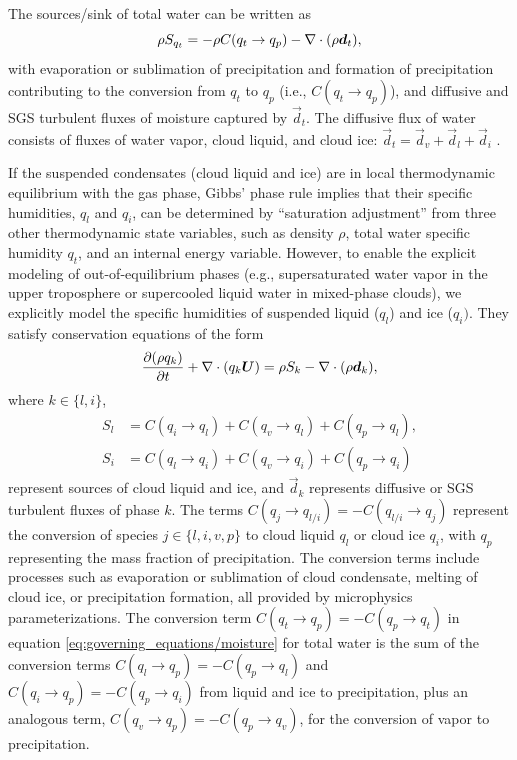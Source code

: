 \documentclass{article}
\begin{document}
The sources/sink of total water can be written as  
\begin{equation}
     \rho S_{q_t} = - \rho C(q_t \rightarrow q_p) - \nabla \cdot (\rho \boldsymbol{{d}}_t),
\end{equation}
with evaporation or sublimation of precipitation and formation of precipitation contributing to the conversion from $q_t$ to $q_p$ (i.e., $C(q_t \rightarrow q_p)$), and diffusive and SGS turbulent fluxes of moisture captured by $\vec{d}_t$. The diffusive flux of water consists of fluxes of water vapor, cloud liquid, and cloud ice: $\vec{d}_t =\vec{d}_v + \vec{d}_l + \vec{d}_i$ \citep{Romps08a}.

If the suspended condensates (cloud liquid and ice) are in local thermodynamic equilibrium with the gas phase, Gibbs' phase rule implies that their specific humidities, $q_l$ and $q_i$, can be determined by ``saturation adjustment'' from three other thermodynamic state variables, such as density $\rho$, total water specific humidity $q_t$, and an internal energy variable. However, to enable the explicit modeling of out-of-equilibrium phases (e.g., supersaturated water vapor in the upper troposphere or supercooled liquid water in mixed-phase clouds), we explicitly model the specific humidities of suspended liquid ($q_l$) and ice ($q_i)$. They satisfy conservation equations of the form
\begin{equation}
\frac{\partial (\rho q_k)}{\partial t} + \nabla \cdot (q_k \boldsymbol{{U}}) = \rho S_k  -\nabla \cdot (\rho \boldsymbol{{d}}_{k}),   
\label{eq:governing_equations/condensate}
\end{equation}
where $k \in \{l, i\}$, 
\begin{align}
    S_l & = C(q_i \rightarrow q_l) + C(q_v \rightarrow q_l) + C(q_p \rightarrow q_l), \\
    S_i & = C(q_l \rightarrow q_i) + C(q_v \rightarrow q_i) + C(q_p \rightarrow q_i)
\end{align}
represent sources of cloud liquid and ice, and $\vec{d}_{k}$ represents diffusive or SGS turbulent fluxes of phase $k$. The terms $C(q_j \rightarrow q_{l/i}) = - C(q_{l/i} \rightarrow q_j)$ represent the conversion of species $j \in \{l, i, v, p\}$ to cloud liquid $q_l$ or cloud ice $q_i$, with $q_p$ representing the mass fraction of precipitation. The conversion terms include processes such as evaporation or sublimation of cloud condensate, melting of cloud ice, or precipitation formation, all provided by microphysics parameterizations. The conversion term $C(q_t \rightarrow q_p) = -C(q_p \rightarrow q_t)$ in equation \eqref{eq:governing_equations/moisture} for total water is the sum of the conversion terms $C(q_l \rightarrow q_p)=-C(q_p \rightarrow q_l)$ and $C(q_i \rightarrow q_p)=-C(q_p \rightarrow q_i)$ from liquid and ice to precipitation, plus an analogous term, $C(q_v \rightarrow q_p)=-C(q_p \rightarrow q_v)$, for the conversion of vapor to precipitation. 
 
\end{document}
